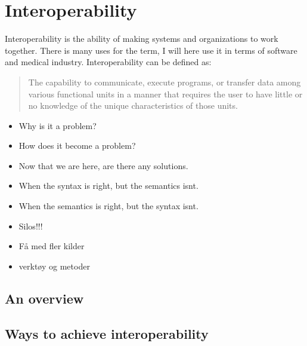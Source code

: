 \chapter{Interoperability}
Interoperability is the ability of making systems and organizations to work together.
There is many uses for the term, I will here use it in terms of software and medical industry.
Interoperability can be defined as:
\begin{quote}
The capability to communicate, execute programs, or transfer data among various functional units in a manner that requires the user to have little or no knowledge of the unique characteristics of those units.\cite{12}
\end{quote}
\begin{itemize}
\item Why is it a problem?
\item How does it become a problem?
\item Now that we are here, are there any solutions. 
\item When the syntax is right, but the semantics isnt.
\item When the semantics is right, but the syntax isnt.
\item Silos!!!
\item Få med fler kilder
\item verktøy og metoder
\end{itemize}
\section{An overview}
\section{Ways to achieve interoperability}
